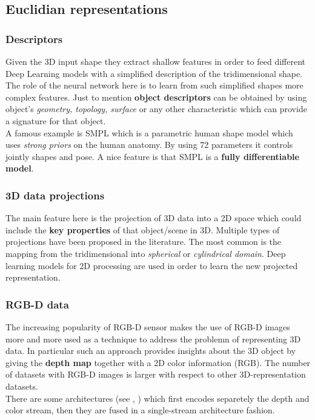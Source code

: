 \subsection{Euclidian representations}
\subsubsection{Descriptors}
Given the 3D input shape they extract shallow features in order to feed different Deep Learning models with a simplified description of the tridimensional shape. The role of the neural network here is to learn from such simplified shapes more complex features. Just to mention \textbf{object descriptors} can be obtained by using object's \textit{geometry, topology, surface} or any other characteristic which can provide a signature for that object. \\
A famous example is SMPL which is a parametric human shape model which uses \textit{strong priors} on the human anatomy. By using 72 parameters it controls jointly shapes and pose. A nice feature is that SMPL is a \textbf{fully differentiable model}.

\subsubsection{3D data projections}
The main feature here is the projection of 3D data into a 2D space which could include the  \textbf{key properties} of that object/scene in 3D. Multiple types of projections  have been proposed in the literature. The most common is the mapping from the tridimensional into \textit{spherical} or \textit{cylindrical domain}. Deep  learning models for 2D processing are used in order to learn the new projected representation.
\subsubsection{RGB-D data}
The increasing popularity of RGB-D sensor makes the use of RGB-D images more and more used as a technique to address the problemn of representing 3D data. In particular such an approach provides insights about the 3D object by giving the \textbf{depth map} together with a 2D color information (RGB). The number of datasets with RGB-D images is larger with respect to other 3D-representation datasets.\\
There are some architectures (see \citeauthor{eitel28multimodal}, \cite{eitel28multimodal}) which first encodes separetely the depth and color stream, then they are fused in a single-stream architecture fashion.

